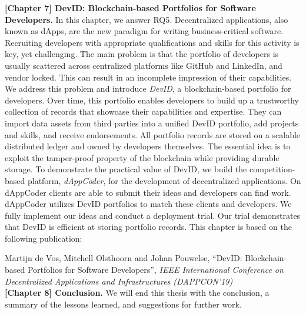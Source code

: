\textbf{[Chapter 7] DevID: Blockchain-based Portfolios for Software Developers.}
In this chapter, we answer RQ5.
Decentralized applications, also known as dApps, are the new paradigm for writing business-critical software.
Recruiting developers with appropriate qualifications and skills for this activity is key, yet challenging.
The main problem is that the portfolio of developers is usually scattered across centralized platforms like GitHub and LinkedIn, and vendor locked.
This can result in an incomplete impression of their capabilities.
We address this problem and introduce \emph{DevID}, a blockchain-based portfolio for developers.
Over time, this portfolio enables developers to build up a trustworthy collection of records that showcase their capabilities and expertise.
They can import data assets from third parties into a unified DevID portfolio, add projects and skills, and receive endorsements.
All portfolio records are stored on a scalable distributed ledger and owned by developers themselves.
The essential idea is to exploit the tamper-proof property of the blockchain while providing durable storage.
To demonstrate the practical value of DevID, we build the competition-based platform, \emph{dAppCoder}, for the development of decentralized applications.
On dAppCoder clients are able to submit their ideas and developers can find work.
dAppCoder utilizes DevID portfolios to match these clients and developers.
We fully implement our ideas and conduct a deployment trial.
Our trial demonstrates that DevID is efficient at storing portfolio records.
This chapter is based on the following publication:

Martijn de Vos, Mitchell Olsthoorn and Johan Pouwelse, \enquote{DevID: Blockchain-based Portfolios for Software Developers}, \emph{IEEE International Conference on Decentralized Applications and Infrastructures (DAPPCON'19)}\\

\textbf{[Chapter 8] Conclusion.} We will end this thesis with the conclusion, a summary of the lessons learned, and suggestions for further work.

\newpage


